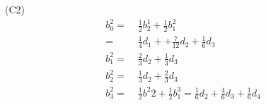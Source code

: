 \documentclass[12pt]{article}
\begin{document}
(C2)
\begin{align*}
b^{2}_{0} =&\; \frac{1}{2} b^{1}_{2} + \frac{1}{2} b^{2}_{1}\\
=&\; \frac{1}{4} d_1 + +\frac{7}{12}d_2 + \frac{1}{6}d_3 \\
b^{2}_{1} =&\; \frac{2}{3} d_2 + \frac{1}{3}d_3 \\
b^{2}_{2} =&\; \frac{1}{3} d_2 + \frac{2}{3}d_3 \\
b^{2}_{3} =&\; \frac{1}{2} b^{2}{2} + \frac{1}{2} b^{3}_{1} =\frac{1}{6}d_2 +\frac{4}{6}d_3 + \frac{1}{6}d_4 \\
\end{align*}
\end{document}
